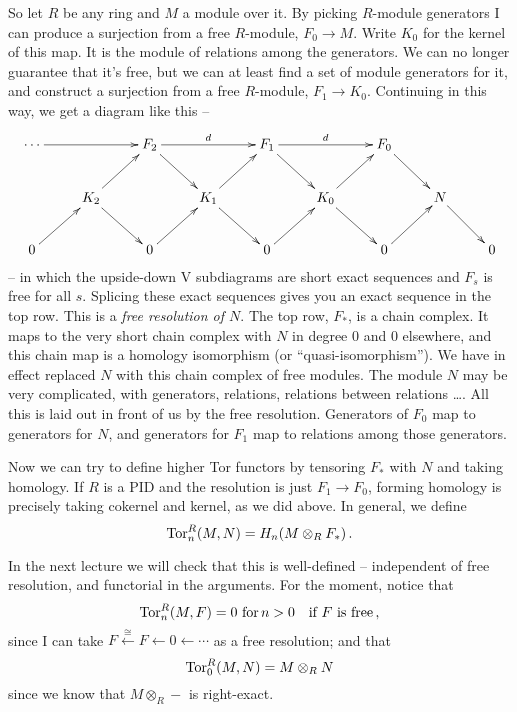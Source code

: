 So let $R$ be any ring and $M$ a module over it. By picking $R$-module
generators I can produce a surjection from a free $R$-module, $F_0\to M$.
Write $K_0$ for the kernel of this map. It is the module of relations among
the generators. We can no longer guarantee that it's free, but we can at 
least find a set of module generators for it, and construct a surjection
from a free $R$-module, $F_1\to K_0$. Continuing in this way, we get a 
diagram like this -- 
\begin{equation*}
\xymatrix{\cdots\ar[rr] & & F_2\ar[dr]\ar[rr]^d & & F_1\ar[dr]\ar[rr]^d & & F_0\ar[dr]\\
& K_2\ar[ur]\ar[dr] & & K_1\ar[ur]\ar[dr] & & K_0\ar[ur]\ar[dr] & & N\ar[dr]\\
0\ar[ur] & & 0\ar[ur] & & 0\ar[ur] & & 0\ar[ur] & & 0}
\end{equation*}
-- in which the upside-down V subdiagrams are short exact sequences
and $F_s$ is free for all $s$. Splicing these exact sequences gives you an 
exact sequence in the top row. This is a \emph{free resolution of $N$}.
The top row, $F_*$, is a chain complex. It maps to the very short chain
complex with $N$ in degree 0 and 0 elsewhere, and this chain map is a 
homology isomorphism (or ``quasi-isomorphism''). We have in effect replaced
$N$ with this chain complex of free modules. The module $N$ may be very
complicated, with generators, relations, relations between relations \ldots.
All this is laid out in front of us by the free resolution. Generators of $F_0$
map to generators for $N$, and generators for $F_1$ map to relations among
those generators. 

Now we can try to define higher Tor functors by tensoring $F_*$ with $N$
and taking homology. If $R$ is a PID and the resolution is just $F_1\to F_0$,
forming homology is precisely taking cokernel and kernel, as we did above. 
In general, we define
\[
\operatorname{Tor}^R_n(M,N)=H_n(M\otimes_R F_\ast)\,.
\]

In the next lecture we will check that this is well-defined -- independent 
of free resolution, and functorial in the arguments. For the moment, notice 
that \[
\operatorname{Tor}^R_n(M,F)=0\,\,\hbox{for}\, n>0 \quad\hbox{if $F$ is free}\,,
\]
since I can take $F\xleftarrow{\cong}F\leftarrow0\leftarrow\cdots$ as a
free resolution; and that 
\[
\operatorname{Tor}^R_0(M,N)=M\otimes_RN
\]
since we know that $M\otimes_R-$ is right-exact.

